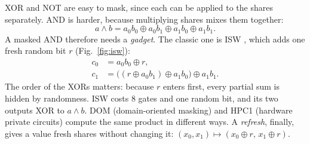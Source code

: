 \documentclass[conference]{IEEEtran}
\begin{document}
XOR and NOT are easy to mask, since each can be applied to the shares separately. AND is harder, because multiplying shares mixes them together:
\[
a\wedge b=a_0b_0\oplus a_0b_1\oplus a_1b_0\oplus a_1b_1 .
\]
A masked AND therefore needs a \emph{gadget}. The classic one is ISW \cite{ishai2003private}, which adds one fresh random bit $r$ (Fig.~\ref{fig:isw}):
\begin{align*}
c_0 &= a_0b_0\oplus r,\\
c_1 &= \big((r\oplus a_0b_1)\oplus a_1b_0\big)\oplus a_1b_1 .
\end{align*}
The order of the XORs matters: because $r$ enters first, every partial sum is hidden by randomness. ISW costs 8 gates and one random bit, and its two outputs XOR to $a\wedge b$. DOM (domain-oriented masking) \cite{gross2016dom} and HPC1 (hardware private circuits) \cite{cassiers2020hpc} compute the same product in different ways. A \emph{refresh}, finally, gives a value fresh shares without changing it: $(x_0,x_1)\mapsto(x_0\oplus r,\,x_1\oplus r)$.
\end{document}
